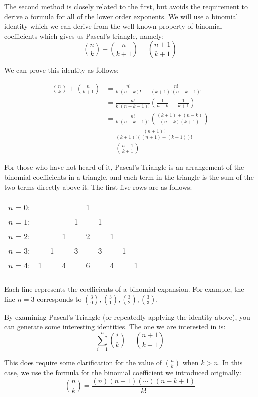 \documentclass{article}
\begin{document}
The second method is closely related to the first, but avoids the requirement to derive
a formula for all of the lower order exponents. We will use a binomial identity which
we can derive from the well-known property of binomial coefficients which gives us
Pascal's triangle, namely:
\[\binom{n}{k} + \binom{n}{k+1} = \binom{n+1}{k+1} \]

We can prove this identity as follows:

\begin{align*}
	\binom{n}{k} + \binom{n}{k+1} &= \frac{n!}{k!(n-k)!} + \frac{n!}{(k+1)!(n-k-1)!} \\
	&= \frac{n!}{k!(n-k-1)!}\left(\frac{1}{n-k} + \frac{1}{k+1}\right) \\
	&= \frac{n!}{k!(n-k-1)!}\left(\frac{(k+1)+(n-k)}{(n-k)(k+1)}\right) \\
	&= \frac{(n+1)!}{(k+1)!((n+1)-(k+1))!} \\
	&= \binom{n+1}{k+1}
\end{align*}

For those who have not heard of it, Pascal's Triangle is an arrangement of the
binomial coefficients in a triangle, and each term in the triangle is the sum of the two
terms directly above it. The first five rows are as follows:

\begin{tabular}{rccccccccc}
$n=0$:&    &    &    &    &  1\\\noalign{\smallskip\smallskip}
$n=1$:&    &    &    &  1 &    &  1\\\noalign{\smallskip\smallskip}
$n=2$:&    &    &  1 &    &  2 &    &  1\\\noalign{\smallskip\smallskip}
$n=3$:&    &  1 &    &  3 &    &  3 &    &  1\\\noalign{\smallskip\smallskip}
$n=4$:&  1 &    &  4 &    &  6 &    &  4 &    &  1\\\noalign{\smallskip\smallskip}
\end{tabular}

Each line represents the coefficients of a binomial expansion. For example, the line $n=3$
corresponds to $\binom{3}{0}, \binom{3}{1}, \binom{3}{2}, \binom{3}{3}$.

By examining Pascal's Triangle (or repeatedly applying the identity above), you can generate
some interesting identities. The one we are interested in is:
\[ \sum_{i=1}^{n} \binom{i}{k} = \binom{n+1}{k+1} \]

This does require some clarification for the value of $\binom{n}{k}$ when $k>n$. In this case, we use the formula for the binomial coefficient we introduced originally:
\[ \binom{n}{k} = \frac{(n)(n-1)(\cdots)(n-k+1)}{k!} \]
\end{document}
